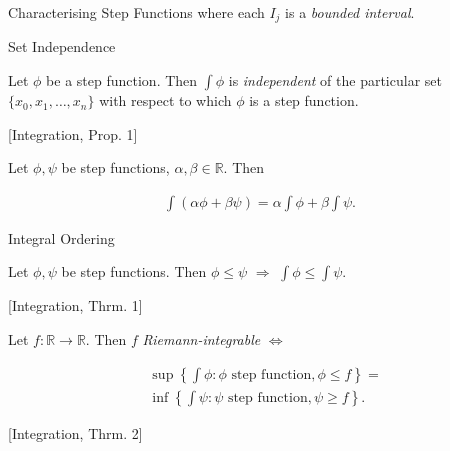 \documentclass[10pt]{article} %
\renewcommand{\leq}{\leqslant}
\renewcommand{\geq}{\geqslant}
\begin{document}
\begin{multicols}{3}
\begin{exercise}{}{Characterising Step Functions}
    where each $I_j$ is a \emph{bounded interval}.

\end{exercise}

\begin{lemma}{}{Set Independence}

    Let $\phi$ be a step function. Then $\int \phi$ is \emph{independent} of the particular set $\{x_0,x_1,\hdots,x_n\}$ with respect to which $\phi$ is a step function.

\end{lemma}

\begin{proposition}{[Integration, Prop. 1]}{}

    Let $\phi, \psi$ be step functions, $\alpha, \beta \in \mathbb{R}$. Then

        \begin{align*}
            \int (\alpha \phi + \beta \psi) = \alpha \int \phi + \beta \int \psi.
        \end{align*}

\end{proposition}

\begin{exercise}{}{Integral Ordering}

    Let $\phi, \psi$ be step functions. Then $\phi \leq \psi$ $\Rightarrow$ $\int \phi \leq \int \psi$.

\end{exercise}

\begin{theorem}{[Integration, Thrm. 1]}{}

    Let $f: \mathbb{R} \to \mathbb{R}$. Then $f$ \emph{Riemann-integrable} $\Leftrightarrow$

        \begin{align*}
            &\sup\left\{\int \phi: \phi\,\, \textrm{step function}, \phi \leq f\right\} = \\
            &\inf\left\{\int \psi: \psi\,\, \textrm{step function}, \psi \geq f\right\}.
        \end{align*}

\end{theorem}

\begin{theorem}{[Integration, Thrm. 2]}{}


\end{theorem}
\end{multicols}
\end{document}
